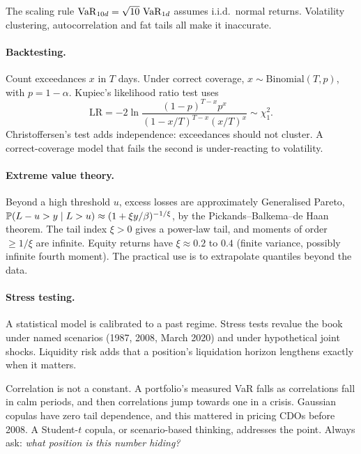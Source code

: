The scaling rule $\operatorname{VaR}_{10d}=\sqrt{10}\,\operatorname{VaR}_{1d}$ assumes i.i.d.\ normal returns. Volatility clustering, autocorrelation and fat tails all make it inaccurate.

\paragraph{Backtesting.} Count exceedances $x$ in $T$ days. Under correct coverage, $x\sim\mathrm{Binomial}(T,p)$, with $p=1-\alpha$. Kupiec's likelihood ratio test uses
\[
\mathrm{LR}=-2\ln\frac{(1-p)^{T-x}p^x}{(1-x/T)^{T-x}(x/T)^x}\sim\chi^2_1.
\]
Christoffersen's test adds independence: exceedances should not cluster. A correct-coverage model that fails the second is under-reacting to volatility.

\paragraph{Extreme value theory.} Beyond a high threshold $u$, excess losses are approximately Generalised Pareto, $\mathbb{P}(L-u>y\mid L>u)\approx(1+\xi y/\beta)^{-1/\xi}$, by the Pickands--Balkema--de Haan theorem. The tail index $\xi>0$ gives a power-law tail, and moments of order $\ge1/\xi$ are infinite. Equity returns have $\xi\approx0.2$ to $0.4$ (finite variance, possibly infinite fourth moment). The practical use is to extrapolate quantiles beyond the data.

\paragraph{Stress testing.} A statistical model is calibrated to a past regime. Stress tests revalue the book under named scenarios (1987, 2008, March 2020) and under hypothetical joint shocks. Liquidity risk adds that a position's liquidation horizon lengthens exactly when it matters.

\begin{pitfall}
Correlation is not a constant. A portfolio's measured VaR falls as correlations fall in calm periods, and then correlations jump towards one in a crisis. Gaussian copulas have zero tail dependence, and this mattered in pricing CDOs before 2008. A Student-$t$ copula, or scenario-based thinking, addresses the point. Always ask: \emph{what position is this number hiding?}
\end{pitfall}

